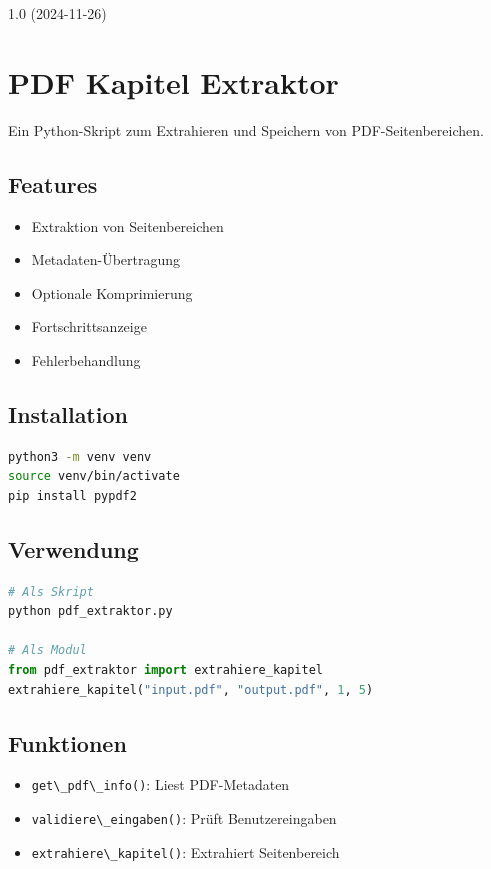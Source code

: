 \documentclass{content/vorlage-design-main}
\begin{document}
1.0 (2024-11-26)

\section{PDF Kapitel Extraktor}\label{pdf-kapitel-extraktor}

Ein Python-Skript zum Extrahieren und Speichern von PDF-Seitenbereichen.

\subsection{Features}\label{features-2}

\begin{itemize}

\item
  Extraktion von Seitenbereichen
\item
  Metadaten-Übertragung
\item
  Optionale Komprimierung
\item
  Fortschrittsanzeige
\item
  Fehlerbehandlung
\end{itemize}

\subsection{Installation}\label{installation-1}

\begin{lstlisting}[language=bash]
python3 -m venv venv
source venv/bin/activate
pip install pypdf2
\end{lstlisting}

\subsection{Verwendung}\label{verwendung-3}

\begin{lstlisting}[language=Python]
# Als Skript
python pdf_extraktor.py

# Als Modul
from pdf_extraktor import extrahiere_kapitel
extrahiere_kapitel("input.pdf", "output.pdf", 1, 5)
\end{lstlisting}

\subsection{Funktionen}\label{funktionen}

\begin{itemize}

\item
  \verb|get\_pdf\_info()|: Liest PDF-Metadaten
\item
  \verb|validiere\_eingaben()|: Prüft
  Benutzereingaben
\item
  \verb|extrahiere\_kapitel()|: Extrahiert
  Seitenbereich
\end{itemize}
\end{document}
